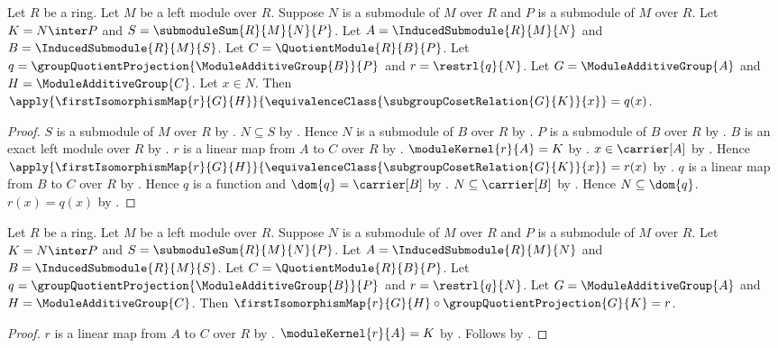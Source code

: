 \begin{proposition}\label{module_second_isomorphism_map_apply}
    Let $R$ be a ring.
    Let $M$ be a left module over $R$.
    Suppose $N$ is a submodule of $M$ over $R$ and
        $P$ is a submodule of $M$ over $R$.
    Let $K=N\inter P$ and $S=\submoduleSum{R}{M}{N}{P}$.
    Let $A=\InducedSubmodule{R}{M}{N}$ and
        $B=\InducedSubmodule{R}{M}{S}$.
    Let $C=\QuotientModule{R}{B}{P}$.
    Let $q=\groupQuotientProjection{\ModuleAdditiveGroup{B}}{P}$ and
        $r=\restrl{q}{N}$.
    Let $G=\ModuleAdditiveGroup{A}$ and
        $H=\ModuleAdditiveGroup{C}$.
    Let $x\in N$.
    Then
        $\apply{\firstIsomorphismMap{r}{G}{H}}{
            \equivalenceClass{\subgroupCosetRelation{G}{K}}{x}}
        =q(x)$.
\end{proposition}
\begin{proof}
    $S$ is a submodule of $M$ over $R$ by
        .
    $N\subseteq S$ by .
    Hence $N$ is a submodule of $B$ over $R$ by
        .
    $P$ is a submodule of $B$ over $R$ by
        .
    $B$ is an exact left module over $R$ by
        .
    $r$ is a linear map from $A$ to $C$ over $R$ by
        .
    $\moduleKernel{r}{A}=K$ by
        .
    $x\in\carrier[A]$ by .
    Hence
        $\apply{\firstIsomorphismMap{r}{G}{H}}{
            \equivalenceClass{\subgroupCosetRelation{G}{K}}{x}}
        =r(x)$ by .
    $q$ is a linear map from $B$ to $C$ over $R$ by
        .
    Hence $q$ is a function and $\dom{q}=\carrier[B]$ by
        .
    $N\subseteq\carrier[B]$ by .
    Hence $N\subseteq\dom{q}$.
    $r(x)=q(x)$ by .
\end{proof}

\begin{theorem}\label{module_second_isomorphism_factorization}
    Let $R$ be a ring.
    Let $M$ be a left module over $R$.
    Suppose $N$ is a submodule of $M$ over $R$ and
        $P$ is a submodule of $M$ over $R$.
    Let $K=N\inter P$ and $S=\submoduleSum{R}{M}{N}{P}$.
    Let $A=\InducedSubmodule{R}{M}{N}$ and
        $B=\InducedSubmodule{R}{M}{S}$.
    Let $C=\QuotientModule{R}{B}{P}$.
    Let $q=\groupQuotientProjection{\ModuleAdditiveGroup{B}}{P}$ and
        $r=\restrl{q}{N}$.
    Let $G=\ModuleAdditiveGroup{A}$ and
        $H=\ModuleAdditiveGroup{C}$.
    Then
        $\firstIsomorphismMap{r}{G}{H}\circ
            \groupQuotientProjection{G}{K}=r$.
\end{theorem}
\begin{proof}
    $r$ is a linear map from $A$ to $C$ over $R$ by
        .
    $\moduleKernel{r}{A}=K$ by
        .
    Follows by .
\end{proof}

